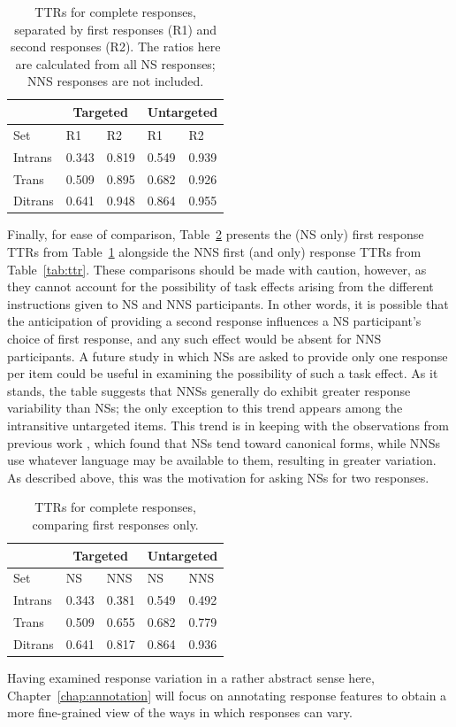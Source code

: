 \begin{table}[h!]
\begin{center}
\begin{tabular}{|l||l|l||l|l|}
\hline
 & \multicolumn{2}{|c||}{Targeted} & \multicolumn{2}{|c|}{Untargeted} \\
\hline
 Set & R1 & R2 & R1 & R2 \\
\hline
\hline
Intrans & 0.343 & 0.819 & 0.549 & 0.939 \\
\hline
Trans & 0.509 & 0.895 & 0.682 & 0.926 \\ %
\hline
Ditrans & 0.641 & 0.948 & 0.864 & 0.955  \\ 
\hline
\end{tabular}
\caption{\label{tab:ttr1v2} TTRs for complete responses, separated by first responses (R1) and second responses (R2). The ratios here are calculated from all NS responses; NNS responses are not included.}
\end{center}
\end{table}

Finally, for ease of comparison, Table~\ref{tab:ttr1v1} presents the (NS only) first response TTRs from Table~\ref{tab:ttr1v2} alongside the NNS first (and only) response TTRs from Table~\ref{tab:ttr}. These comparisons should be made with caution, however, as they cannot account for the possibility of task effects arising from the different instructions given to NS and NNS participants. In other words, it is possible that the anticipation of providing a second response influences a NS participant's choice of first response, and any such effect would be absent for NNS participants. A future study in which NSs are asked to provide only one response per item could be useful in examining the possibility of such a task effect. As it stands, the table suggests that NNSs generally do exhibit greater response variability than NSs; the only exception to this trend appears among the intransitive untargeted items. This trend is in keeping with the observations from previous work \citep{king:dickinson:13}, which found that NSs tend toward canonical forms, while NNSs use whatever language may be available to them, resulting in greater variation. As described above, this was the motivation for asking NSs for two responses.

\begin{table}[h!]
\begin{center}
\begin{tabular}{|l||l|l||l|l|}
\hline
 & \multicolumn{2}{|c||}{Targeted} & \multicolumn{2}{|c|}{Untargeted} \\
\hline
 Set & NS & NNS & NS & NNS \\
\hline
\hline
Intrans & 0.343 & 0.381 & 0.549 & 0.492 \\
\hline
Trans & 0.509 & 0.655 & 0.682 & 0.779 \\ %
\hline
Ditrans & 0.641 & 0.817 & 0.864 & 0.936  \\ 
\hline
\end{tabular}
\caption{\label{tab:ttr1v1} TTRs for complete responses, comparing first responses only.}
\end{center}
\end{table}

Having examined response variation in a rather abstract sense here, Chapter~\ref{chap:annotation} will focus on annotating response features to obtain a more fine-grained view of the ways in which responses can vary.

